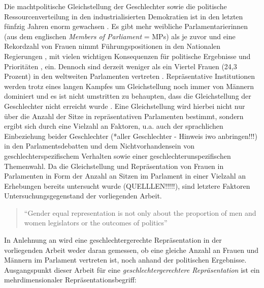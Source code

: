 \documentclass[12pt, 
    twoside=false, 
    bibliography=totoc, 
    numbers=endperiod, 
    headings=normal, 
    toc=chapterentrydotfill
    ]{scrbook}
\begin{document}
Die machtpolitische Gleichstellung der Geschlechter sowie die politische Ressourcenverteilung in den industrialisierten Demokratien ist in den letzten fünfzig Jahren enorm gewachsen \parencite[318]{coffe_2010}. Es gibt mehr weibliche Parlamentarierinnen (aus dem englischen \emph{Members of Parliament} = MPs) als je zuvor und eine Rekordzahl von Frauen nimmt Führungspositionen in den Nationalen Regierungen \parencites{lovenduski_2005}{paxton_2007}, mit vielen wichtigen Konsequenzen für politische Ergebnisse und Prioritäten \parencites{bolzendahl_2007}{carroll_2001}{waring_2000}[318]{coffe_2010}, ein. Dennoch sind derzeit weniger als ein Viertel Frauen (24,3 Prozent) in den weltweiten Parlamenten vertreten \parencite{ipu_2019}. Repräsentative Institutionen werden trotz eines langen Kampfes um Gleichstellung noch immer von Männern dominiert \parencites[149]{celis_2018}[497 f.;]{childs_2013}{dahlerup_2013} {bjarnegard_2013} und es ist nicht umstritten zu behaupten, dass die Gleichstellung der Geschlechter nicht erreicht wurde \parencite[150]{celis_2018}. Eine Gleichstellung wird hierbei nicht nur über die Anzahl der Sitze in repräsentativen Parlamenten bestimmt, sondern ergibt sich durch eine Vielzahl an Faktoren, u.a. auch der sprachlichen Einbeziehung beider Geschlechter (*aller Geschlechter - Hinweis iwo anbringen!!!) in den Parlamentsdebatten und dem Nichtvorhandensein von geschlechterspezifischem Verhalten sowie einer geschlechterunspezifischen Themenwahl. Da die Gleichstellung und Repräsentation von Frauen in Parlamenten in Form der Anzahl an Sitzen im Parlament in einer Vielzahl an Erhebungen bereits untersucht wurde (QUELLLEN!!!!!), sind letztere Faktoren Untersuchungsgegenstand der vorliegenden Arbeit. 

\begin{quote}
     \enquote{Gender equal representation is not only about the proportion of men and women legislators or the outcomes of politics}\parencite[197]{erikson_2018}
 \end{quote}

In Anlehnung an \textcite{erikson_2018} wird eine geschlechtergerechte Repräsentation in der vorliegenden Arbeit weder daran gemessen, ob eine gleiche Anzahl an Frauen und Männern im Parlament vertreten ist, noch anhand der politischen Ergebnisse. Ausgangspunkt dieser Arbeit für eine \emph{geschlechtergerechtere Repräsentation} ist ein mehrdimensionaler Repräsentationsbegriff:
\end{document}
